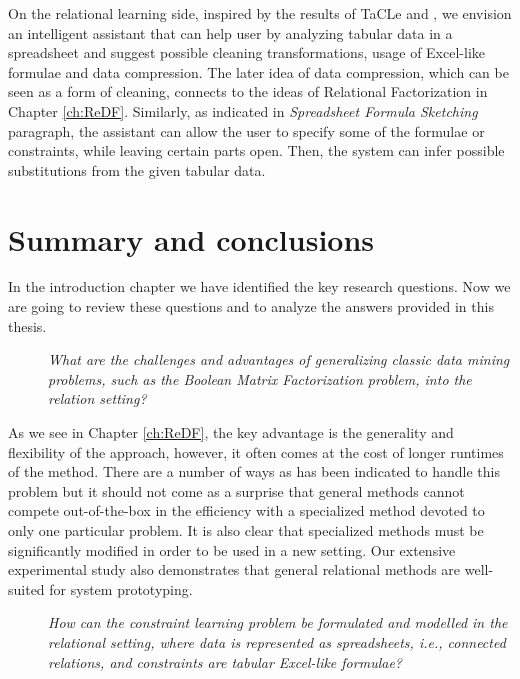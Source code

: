 On the relational learning side, inspired by the results of TaCLe
\cite{tacle} and \cite{flashfill}, we envision an intelligent
assistant that can help user by analyzing tabular data in a
spreadsheet and suggest possible cleaning transformations, usage of
Excel-like formulae and data compression. The later idea of data
compression, which can be seen as a form of cleaning, connects to the
ideas of Relational Factorization in Chapter \ref{ch:ReDF}.
Similarly, as indicated in \textit{Spreadsheet Formula Sketching}
paragraph, the assistant can allow the user to specify some of the
formulae or constraints, while leaving certain parts open. Then, the
system can infer possible substitutions from the given tabular data.


\section{Summary and conclusions}
In the introduction chapter we have identified the key research
questions. Now we are going to review these questions and to analyze the answers provided in this thesis.

\begin{description}
\item[\cone] \textit{What are the challenges and advantages of generalizing
    classic data mining problems, such as the Boolean Matrix
  Factorization problem, into the relation setting?}
\end{description}

As we see in Chapter \ref{ch:ReDF}, the key advantage is the
generality and flexibility of the approach, however, it often comes at
the cost of longer runtimes of the method. There are a number of ways
as has been indicated to handle this problem but it should not come as
a surprise that general methods cannot compete out-of-the-box in the efficiency with
a specialized method devoted to only one particular problem. It is
also clear that specialized methods must be significantly modified in
order to be used in a new setting. Our extensive experimental study
also demonstrates that general relational methods are well-suited for
system prototyping.

\begin{description}
    \item[\ctwo] \textit{How can the constraint learning problem be formulated
   and modelled in the relational setting, where data is
   represented as spreadsheets, i.e., connected relations, and constraints are
   tabular Excel-like formulae?}
\end{description}

